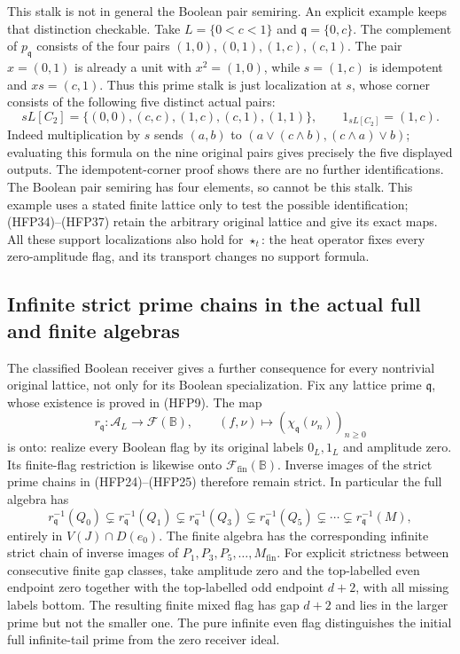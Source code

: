 This stalk is not in general the Boolean pair semiring.
An explicit example keeps that distinction checkable. Take
$L=\{0<c<1\}$ and $\mathfrak q=\{0,c\}$. The complement
of $p_{\mathfrak q}$ consists of the four pairs
$(1,0),(0,1),(1,c),(c,1)$. The pair $x=(0,1)$ is already
a unit with $x^2=(1,0)$, while $s=(1,c)$ is idempotent
and $xs=(c,1)$. Thus this prime stalk is just localization
at $s$, whose corner consists of the following five
distinct actual pairs:
\begin{equation}\tag{HFP38}
 sL[C_2]=\{(0,0),(c,c),(1,c),(c,1),(1,1)\},
              \qquad 1_{sL[C_2]}=(1,c).
\end{equation}
Indeed multiplication by $s$ sends $(a,b)$ to
$(a\vee(c\wedge b),(c\wedge a)\vee b)$; evaluating
this formula on the nine original pairs gives precisely
the five displayed outputs. The idempotent-corner proof
shows there are no further identifications. The Boolean
pair semiring has four elements, so cannot be this stalk.
This example uses a stated finite lattice only to test
the possible identification; (HFP34)--(HFP37) retain
the arbitrary original lattice and give its exact maps.
All these support localizations also hold for $\star_t$:
the heat operator fixes every zero-amplitude flag, and
its transport changes no support formula.

\subsection{Infinite strict prime chains in the actual full and finite algebras}

The classified Boolean receiver gives a further consequence for
every nontrivial original lattice, not only for its Boolean
specialization. Fix any lattice prime $\mathfrak q$, whose
existence is proved in (HFP9). The map
\begin{equation}\tag{HFP39}
 r_{\mathfrak q}:\mathcal A_L\longrightarrow\mathcal F(\mathbb B),
       \qquad (f,\nu)\longmapsto
                         (\chi_{\mathfrak q}(\nu_n))_{n\ge0}
\end{equation}
is onto: realize every Boolean flag by its original labels
$0_L,1_L$ and amplitude zero. Its finite-flag restriction is
likewise onto $\mathcal F_{\mathrm{fin}}(\mathbb B)$.
Inverse images of the strict prime chains in (HFP24)--(HFP25)
therefore remain strict. In particular the full algebra has
\[
 r_{\mathfrak q}^{-1}(Q_0)\subsetneq
 r_{\mathfrak q}^{-1}(Q_1)\subsetneq
 r_{\mathfrak q}^{-1}(Q_3)\subsetneq
 r_{\mathfrak q}^{-1}(Q_5)\subsetneq\cdots
 \subsetneq r_{\mathfrak q}^{-1}(M),
\]
entirely in $V(J)\cap D(e_0)$. The finite algebra has
the corresponding infinite strict chain of inverse images
of $P_1,P_3,P_5,\ldots,M_{\mathrm{fin}}$.
For explicit strictness between consecutive finite gap
classes, take amplitude zero and the top-labelled even
endpoint zero together with the top-labelled odd endpoint
$d+2$, with all missing labels bottom. The resulting
finite mixed flag has gap $d+2$ and lies in the larger
prime but not the smaller one. The pure infinite even
flag distinguishes the initial full infinite-tail prime
from the zero receiver ideal.

